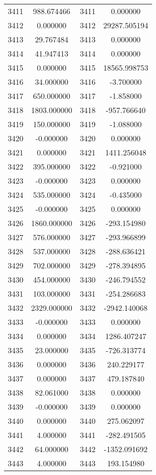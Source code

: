 \documentclass[12pt]{article}
\begin{document}
\begin{longtable}{@{}cccc@{}}
3411 & 988.674466 & 3411 & 0.000000 \\
3412 & 0.000000 & 3412 & 29287.505194 \\
3413 & 29.767484 & 3413 & 0.000000 \\
3414 & 41.947413 & 3414 & 0.000000 \\
3415 & 0.000000 & 3415 & 18565.998753 \\
3416 & 34.000000 & 3416 & -3.700000 \\
3417 & 650.000000 & 3417 & -1.858000 \\
3418 & 1803.000000 & 3418 & -957.766640 \\
3419 & 150.000000 & 3419 & -1.088000 \\
3420 & -0.000000 & 3420 & 0.000000 \\
3421 & 0.000000 & 3421 & 1411.256048 \\
3422 & 395.000000 & 3422 & -0.921000 \\
3423 & -0.000000 & 3423 & 0.000000 \\
3424 & 535.000000 & 3424 & -0.435000 \\
3425 & -0.000000 & 3425 & 0.000000 \\
3426 & 1860.000000 & 3426 & -293.154980 \\
3427 & 576.000000 & 3427 & -293.966899 \\
3428 & 537.000000 & 3428 & -288.636421 \\
3429 & 702.000000 & 3429 & -278.394895 \\
3430 & 454.000000 & 3430 & -246.794552 \\
3431 & 103.000000 & 3431 & -254.286683 \\
3432 & 2329.000000 & 3432 & -2942.140068 \\
3433 & -0.000000 & 3433 & 0.000000 \\
3434 & 0.000000 & 3434 & 1286.407247 \\
3435 & 23.000000 & 3435 & -726.313774 \\
3436 & 0.000000 & 3436 & 240.229177 \\
3437 & 0.000000 & 3437 & 479.187840 \\
3438 & 82.061000 & 3438 & 0.000000 \\
3439 & -0.000000 & 3439 & 0.000000 \\
3440 & 0.000000 & 3440 & 275.062097 \\
3441 & 4.000000 & 3441 & -282.491505 \\
3442 & 64.000000 & 3442 & -1352.091692 \\
3443 & 4.000000 & 3443 & 193.154980 \\

\end{longtable}
\end{document}
